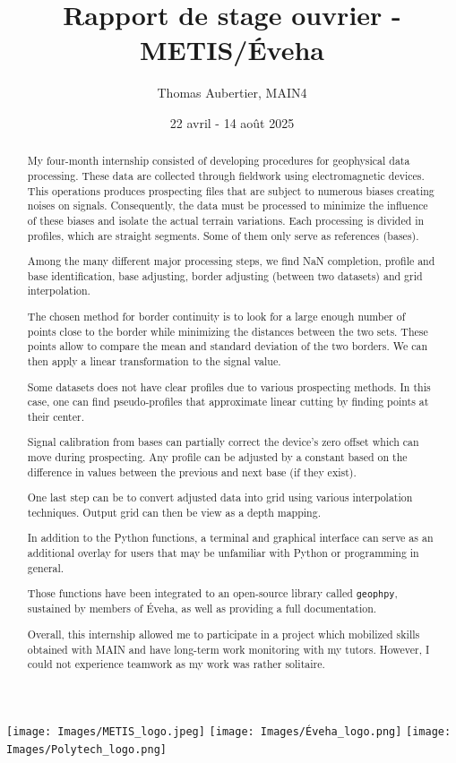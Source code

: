 \documentclass[12pt]{article}
\title{Rapport de stage ouvrier - METIS/Éveha}
\author{Thomas Aubertier, MAIN4}
\date{22 avril - 14 août 2025}
\begin{document}
\maketitle

\vskip 40pt
\texttt{[image: Images/METIS\_logo.jpeg]} 
\hfill
\texttt{[image: Images/Éveha\_logo.png]}
\vskip 40pt
\texttt{[image: Images/Polytech\_logo.png]}  

\newpage
\begin{abstract}
    My four-month internship consisted of developing procedures for geophysical data processing. These data are collected through fieldwork using electromagnetic devices. This operations produces prospecting files that are subject to numerous biases creating noises on signals. Consequently, the data must be processed to minimize the influence of these biases and isolate the actual terrain variations. Each processing is divided in profiles, which are straight segments. Some of them only serve as references (bases).

    Among the many different major processing steps, we find NaN completion, profile and base identification, base adjusting, border adjusting (between two datasets) and grid interpolation.

    The chosen method for border continuity is to look for a large enough number of points close to the border while minimizing the distances between the two sets. These points allow to compare the mean and standard deviation of the two borders. We can then apply a linear transformation to the signal value.

    Some datasets does not have clear profiles due to various prospecting methods. In this case, one can find pseudo-profiles that approximate linear cutting by finding points at their center.

    Signal calibration from bases can partially correct the device's zero offset which can move during prospecting. Any profile can be adjusted by a constant based on the difference in values between the previous and next base (if they exist).

    One last step can be to convert adjusted data into grid using various interpolation techniques. Output grid can then be view as a depth mapping.

    In addition to the Python functions, a terminal and graphical interface can serve as an additional overlay for users that may be unfamiliar with Python or programming in general.

    Those functions have been integrated to an open-source library called \texttt{geophpy}, sustained by members of Éveha, as well as providing a full documentation.

    Overall, this internship allowed me to participate in a project which mobilized skills obtained with MAIN and have long-term work monitoring with my tutors. However, I could not experience teamwork as my work was rather solitaire.
\end{abstract}
\end{document}
